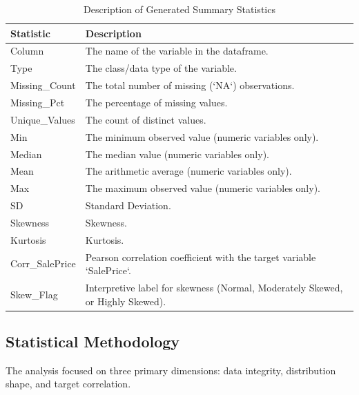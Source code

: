 \documentclass[12pt,oneside]{article} %
\begin{document}
\begin{table}[h]
    \centering
    \renewcommand{\arraystretch}{1.2} %
    \begin{tabular}{l p{10cm}}
        \toprule
        \textbf{Statistic} & \textbf{Description} \\
        \midrule
        Column & The name of the variable in the dataframe. \\
        Type & The class/data type of the variable. \\
        Missing\_Count & The total number of missing (`NA`) observations. \\
        Missing\_Pct & The percentage of missing values. \\
        Unique\_Values & The count of distinct values. \\
        Min & The minimum observed value (numeric variables only). \\
        Median & The median value (numeric variables only). \\
        Mean & The arithmetic average (numeric variables only). \\
        Max & The maximum observed value (numeric variables only). \\
        SD & Standard Deviation. \\
        Skewness & Skewness. \\
        Kurtosis & Kurtosis. \\
        Corr\_SalePrice & Pearson correlation coefficient with the target variable `SalePrice`. \\
        Skew\_Flag & Interpretive label for skewness (Normal, Moderately Skewed, or Highly Skewed). \\
        \bottomrule
    \end{tabular}
    \caption{Description of Generated Summary Statistics}
    \label{tab:statistics_desc}
\end{table}

\subsection{Statistical Methodology}
The analysis focused on three primary dimensions: data integrity, distribution shape, and target correlation.
\end{document}
